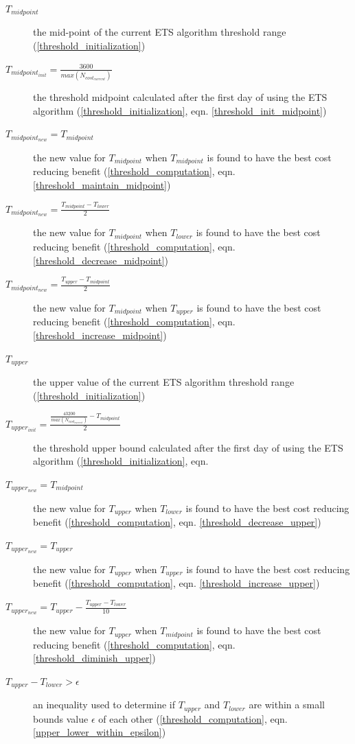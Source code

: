 \begin{description}
\item[$T_{midpoint}$] the mid-point of the current ETS algorithm threshold range (\ref{threshold_initialization})
\item[$T_{midpoint_{init}} = \frac{3600}{max(N_{cost_{current}})}$] the threshold midpoint calculated after the first day of using the ETS algorithm (\ref{threshold_initialization}, eqn. \ref{threshold_init_midpoint})
\item[$T_{midpoint_{new}} = T_{midpoint}$] the new value for $T_{midpoint}$ when $T_{midpoint}$ is found to have the best cost reducing benefit (\ref{threshold_computation}, eqn. \ref{threshold_maintain_midpoint})
\item[$T_{midpoint_{new}} = \frac{T_{midpoint} - T_{lower}}{2}$] the new value for $T_{midpoint}$ when $T_{lower}$ is found to have the best cost reducing benefit (\ref{threshold_computation}, eqn. \ref{threshold_decrease_midpoint})
\item[$T_{midpoint_{new}} = \frac{T_{upper} - T_{midpoint}}{2}$]  the new value for $T_{midpoint}$ when $T_{upper}$ is found to have the best cost reducing benefit (\ref{threshold_computation}, eqn. \ref{threshold_increase_midpoint})
\item[$T_{upper}$] the upper value of the current ETS algorithm threshold range (\ref{threshold_initialization})
\item[$T_{upper_{init}} = \frac{\displaystyle\frac{43200}{max(N_{cost_{current}})} - T_{midpoint}}{2}$] the threshold upper bound calculated after the first day of using the ETS algorithm (\ref{threshold_initialization}, eqn. \item[$T_{upper_{new}} = T_{midpoint}$] the new value for $T_{upper}$ when $T_{lower}$ is found to have the best cost reducing benefit (\ref{threshold_computation}, eqn. \ref{threshold_decrease_upper})
\item[$T_{upper_{new}} = T_{upper}$] the new value for $T_{upper}$ when $T_{upper}$ is found to have the best cost reducing benefit (\ref{threshold_computation}, eqn. \ref{threshold_increase_upper})
\item[$T_{upper_{new}} = T_{upper} - \frac{T_{upper} - T_{lower}}{10}$] the new value for $T_{upper}$ when $T_{midpoint}$ is found to have the best cost reducing benefit (\ref{threshold_computation}, eqn. \ref{threshold_diminish_upper})
\item[$T_{upper} - T_{lower} > \epsilon$] an inequality used to determine if $T_{upper}$ and $T_{lower}$ are within a small bounds value $\epsilon$ of each other (\ref{threshold_computation}, eqn. \ref{upper_lower_within_epsilon})

\end{description}
